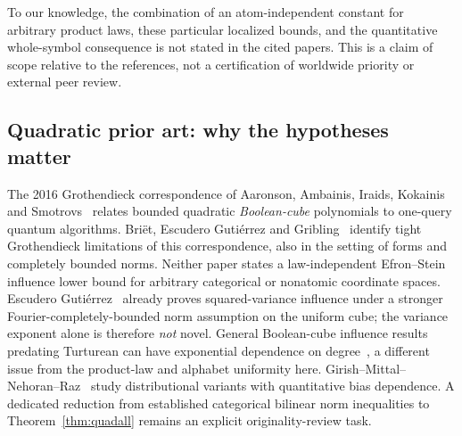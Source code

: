 \documentclass[11pt]{article}
\numberwithin{equation}{section}
\theoremstyle{remark}
\begin{document}
To our knowledge, the combination of an atom-independent constant for arbitrary product laws, these particular localized bounds, and the quantitative whole-symbol consequence is not stated in the cited papers. This is a claim of scope relative to the references, not a certification of worldwide priority or external peer review.

\subsection*{Quadratic prior art: why the hypotheses matter}
The 2016 Grothendieck correspondence of Aaronson, Ambainis, Iraids, Kokainis and Smotrovs~\cite{AAIKS16} relates bounded quadratic \emph{Boolean-cube} polynomials to one-query quantum algorithms. Bri\"et, Escudero Guti\'errez and Gribling~\cite{BEG24} identify tight Grothendieck limitations of this correspondence, also in the setting of forms and completely bounded norms. Neither paper states a law-independent Efron--Stein influence lower bound for arbitrary categorical or nonatomic coordinate spaces. Escudero Guti\'errez~\cite[Theorem~1.6]{EG23} already proves squared-variance influence under a stronger Fourier-completely-bounded norm assumption on the uniform cube; the variance exponent alone is therefore \emph{not} novel. General Boolean-cube influence results predating Turturean can have exponential dependence on degree~\cite{Tur26}, a different issue from the product-law and alphabet uniformity here. Girish--Mittal--Nehoran--Raz~\cite{GMNR26} study distributional variants with quantitative bias dependence. A dedicated reduction from established categorical bilinear norm inequalities to Theorem~\ref{thm:quadall} remains an explicit originality-review task.
\end{document}
